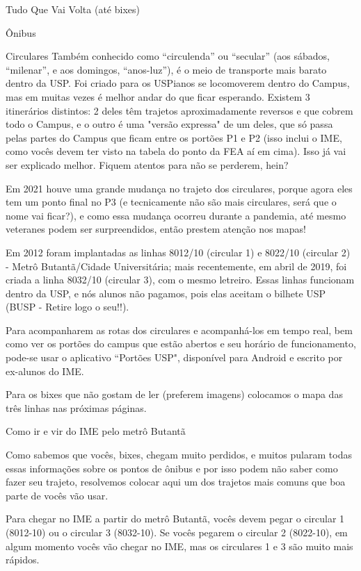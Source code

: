 \begin{secao}{Tudo Que Vai Volta (até bixes)}
\begin{subsecao}{Ônibus}
\begin{subsubsecao}{Circulares}
Também conhecido como ``circulenda'' ou ``secular'' (aos sábados, ``milenar'',
e aos domingos, ``anos-luz''), é o meio de transporte mais barato dentro da USP.
Foi criado para os USPianos se locomoverem dentro do Campus, mas em muitas vezes
é melhor andar do que ficar esperando. Existem 3 itinerários distintos: 2 deles têm
trajetos aproximadamente reversos e que cobrem todo o Campus, e o outro é uma "versão
expressa" de um deles, que só passa pelas partes do Campus que ficam entre os portões
P1 e P2 (isso inclui o IME, como vocês devem ter visto na tabela do ponto da FEA aí
em cima). Isso já vai ser explicado melhor. Fiquem atentos para não se perderem, hein?

Em 2021 houve uma grande mudança no trajeto dos circulares, porque agora eles tem um
ponto final no P3 (e tecnicamente não são mais circulares, será que o nome vai ficar?),
e como essa mudança ocorreu durante a pandemia, até mesmo veteranes podem ser surpreendidos,
então prestem atenção nos mapas!

Em 2012 foram implantadas as linhas 8012/10 (circular 1) e 8022/10 (circular 2)
- Metrô Butantã/Cidade Universitária; mais recentemente, em abril de 2019, foi
criada a linha 8032/10 (circular 3), com o mesmo letreiro. Essas linhas funcionam
dentro da USP, e nós alunos não pagamos, pois elas aceitam o bilhete USP
(BUSP - Retire logo o seu!!).

Para acompanharem as rotas dos circulares e acompanhá-los em tempo real, bem como
ver os portões do campus que estão abertos e seu horário de funcionamento, pode-se
usar o aplicativo “Portões USP", disponível para Android e escrito por ex-alunos
do IME.

Para os bixes que não gostam de ler (preferem imagens) colocamos o
mapa das três linhas nas próximas páginas.


\end{subsubsecao}

\begin{subsubsecao}{Como ir e vir do IME pelo metrô Butantã}

Como sabemos que vocês, bixes, chegam muito perdidos, e muitos pularam todas essas informações
sobre os pontos de ônibus e por isso podem não saber como fazer seu trajeto, resolvemos colocar
aqui um dos trajetos mais comuns que boa parte de vocês vão usar.

Para chegar no IME a partir do metrô Butantã, vocês devem pegar o circular 1 (8012-10) ou o
circular 3 (8032-10). Se vocês pegarem o circular 2 (8022-10), em algum momento vocês vão
chegar no IME, mas os circulares 1 e 3 são muito mais rápidos.


\end{subsubsecao}
\end{subsecao}
\end{secao}
